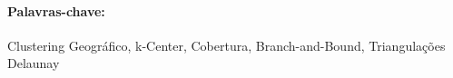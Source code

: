 \documentclass[11pt, oneside]{Thesis} %
\begin{document}
{{\noindent
\paragraph{Palavras-chave:} Clustering Geográfico, k-Center, Cobertura, Branch-and-Bound, Triangulações Delaunay


\clearpage %





\pagestyle{fancy} %

\tableofcontents %

\listoffigures %

\listoftables %





}}
\end{document}
